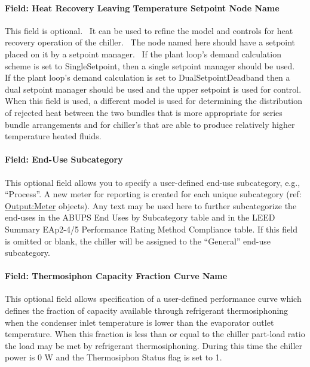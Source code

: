 \paragraph{Field: Heat Recovery Leaving Temperature Setpoint Node Name}\label{field-heat-recovery-leaving-temperature-setpoint-node-name}

This field is optional.~ It can be used to refine the model and controls for heat recovery operation of the chiller.~ The node named here should have a setpoint placed on it by a setpoint manager.~ If the plant loop's demand calculation scheme is set to SingleSetpoint, then a single setpoint manager should be used.~ If the plant loop's demand calculation is set to DualSetpointDeadband then a dual setpoint manager should be used and the upper setpoint is used for control.~ When this field is used, a different model is used for determining the distribution of rejected heat between the two bundles that is more appropriate for series bundle arrangements and for chiller's that are able to produce relatively higher temperature heated fluids.

\paragraph{Field: End-Use Subcategory}\label{end-use-subcategory-13}

This optional field allows you to specify a user-defined end-use subcategory, e.g., ``Process''. A new meter for reporting is created for each unique subcategory (ref: \hyperref[outputmeter-and-outputmetermeterfileonly]{Output:Meter} objects). Any text may be used here to further subcategorize the end-uses in the ABUPS End Uses by Subcategory table and in the LEED Summary EAp2-4/5 Performance Rating Method Compliance table. If this field is omitted or blank, the chiller will be assigned to the ``General'' end-use subcategory.

\paragraph{Field: Thermosiphon Capacity Fraction Curve Name}\label{thermosiphon-capacity-fraction-curve-name2}

This optional field allows specification of a user-defined performance curve which defines the fraction of capacity available through refrigerant thermosiphoning when the condenser inlet temperature is lower than the evaporator outlet temperature. When this fraction is less than or equal to the chiller part-load ratio the load may be met by refrigerant thermosiphoning. During this time the chiller power is 0 W and the Thermosiphon Status flag is set to 1.

